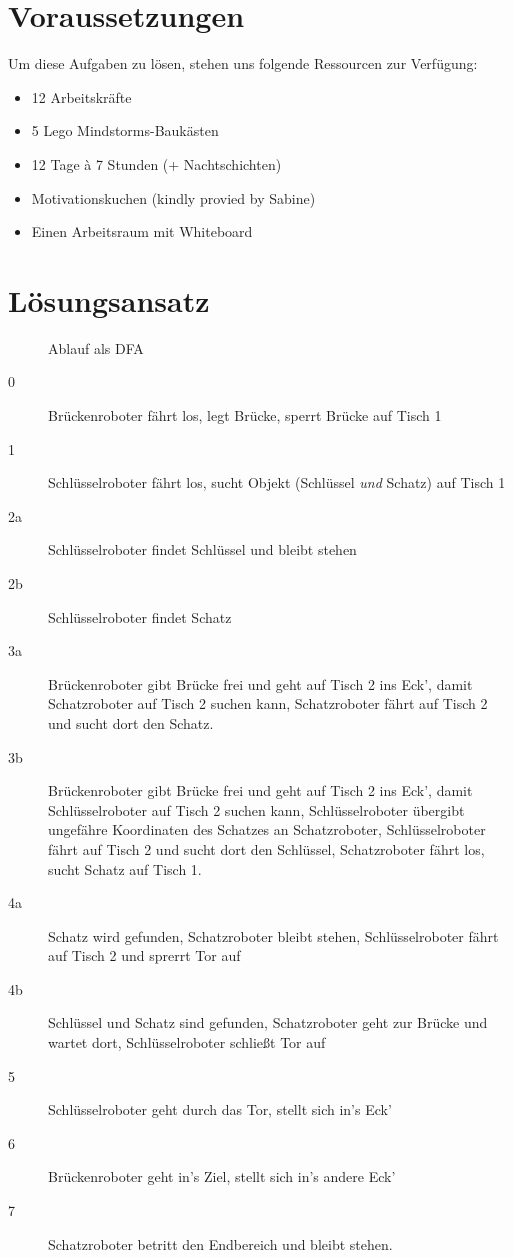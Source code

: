 \documentclass[a4paper]{scrartcl}
\begin{document}
	\section{Voraussetzungen}
	Um diese Aufgaben zu lösen, stehen uns folgende Ressourcen zur Verfügung:
	\begin{itemize}
		\item 12 Arbeitskräfte
		\item 5 Lego Mindstorms-Baukästen
		\item 12 Tage à 7 Stunden (+ Nachtschichten)
		\item Motivationskuchen (kindly provied by Sabine)
		\item Einen Arbeitsraum mit Whiteboard
	\end{itemize}
	\section{Lösungsansatz}
	\begin{figure}[H]
		\caption{Ablauf als DFA}
		\def\svgwidth{\linewidth}
		
	\end{figure}
	\begin{description}
		\item[0] Brückenroboter fährt los, legt Brücke, sperrt Brücke auf Tisch 1
		\item[1] Schlüsselroboter fährt los, sucht Objekt (Schlüssel \emph{und} Schatz) auf Tisch 1
		\item[2a] Schlüsselroboter findet Schlüssel und bleibt stehen
		\item[2b] Schlüsselroboter findet Schatz
		\item[3a] Brückenroboter gibt Brücke frei und geht auf Tisch 2 ins Eck', damit Schatzroboter auf Tisch 2 suchen kann, Schatzroboter fährt auf Tisch 2 und sucht dort den Schatz.
		\item[3b] Brückenroboter gibt Brücke frei und geht auf Tisch 2 ins Eck', damit Schlüsselroboter auf Tisch 2 suchen kann, Schlüsselroboter übergibt ungefähre Koordinaten des Schatzes an Schatzroboter, Schlüsselroboter fährt auf Tisch 2 und sucht dort den Schlüssel, Schatzroboter fährt los, sucht Schatz auf Tisch 1.
		\item[4a] Schatz wird gefunden, Schatzroboter bleibt stehen, Schlüsselroboter fährt auf Tisch 2 und sprerrt Tor auf
		\item[4b] Schlüssel und Schatz sind gefunden, Schatzroboter geht zur Brücke und wartet dort, Schlüs\-sel\-ro\-bo\-ter schließt Tor auf
		\item[5] Schlüsselroboter geht durch das Tor, stellt sich in's Eck'
		\item[6] Brückenroboter geht in's Ziel, stellt sich in's andere Eck'
		\item[7] Schatzroboter betritt den Endbereich und bleibt stehen.
	\end{description}
\end{document}
